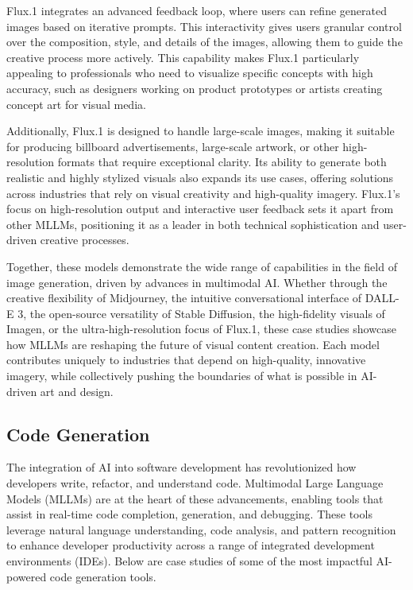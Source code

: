 Flux.1 integrates an advanced feedback loop, where users can refine generated images based on iterative prompts. This interactivity gives users granular control over the composition, style, and details of the images, allowing them to guide the creative process more actively. This capability makes Flux.1 particularly appealing to professionals who need to visualize specific concepts with high accuracy, such as designers working on product prototypes or artists creating concept art for visual media.

Additionally, Flux.1 is designed to handle large-scale images, making it suitable for producing billboard advertisements, large-scale artwork, or other high-resolution formats that require exceptional clarity. Its ability to generate both realistic and highly stylized visuals also expands its use cases, offering solutions across industries that rely on visual creativity and high-quality imagery. Flux.1's focus on high-resolution output and interactive user feedback sets it apart from other MLLMs, positioning it as a leader in both technical sophistication and user-driven creative processes.

Together, these models demonstrate the wide range of capabilities in the field of image generation, driven by advances in multimodal AI. Whether through the creative flexibility of Midjourney, the intuitive conversational interface of DALL-E 3, the open-source versatility of Stable Diffusion, the high-fidelity visuals of Imagen, or the ultra-high-resolution focus of Flux.1, these case studies showcase how MLLMs are reshaping the future of visual content creation. Each model contributes uniquely to industries that depend on high-quality, innovative imagery, while collectively pushing the boundaries of what is possible in AI-driven art and design.

\subsection{Code Generation}

The integration of AI into software development has revolutionized how developers write, refactor, and understand code. Multimodal Large Language Models (MLLMs) are at the heart of these advancements, enabling tools that assist in real-time code completion, generation, and debugging. These tools leverage natural language understanding, code analysis, and pattern recognition to enhance developer productivity across a range of integrated development environments (IDEs). Below are case studies of some of the most impactful AI-powered code generation tools.

